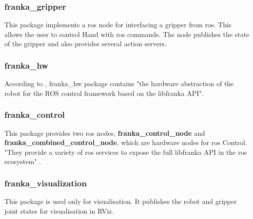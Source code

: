 \subsubsection*{franka\_gripper}
\label{subsubsec:ros_setup_robotic_system_integration_ros_franka_ros_franka_gripper}

This package implements a \gls{ros} node for interfacing a gripper from \gls{ros}. This allows the user to control Hand with \gls{ros} commands. The node publishes the state of the gripper and also provides several action servers.


\subsubsection*{franka\_hw}
\label{subsubsec:ros_setup_robotic_system_integration_ros_franka_ros_franka_hw}

According to \cite{FrankaEmikaGmbH_fci_documentation}, franka\_hw package contains "the hardware abstraction of the robot for the ROS control framework based on the libfranka API".


\subsubsection*{franka\_control}
\label{subsubsec:ros_setup_robotic_system_integration_ros_franka_ros_franka_control}

This package provides two \gls{ros} nodes, \textbf{franka\_control\_node} and \textbf{franka\_combined\_control\_node}, which are hardware nodes for \gls{ros} Control. "They provide a variety of \gls{ros} services to expose the full libfranka API in the \gls{ros} ecosystem" \cite{FrankaEmikaGmbH_fci_documentation}. 


\subsubsection*{franka\_visualization}
\label{subsubsec:ros_setup_robotic_system_integration_ros_franka_ros_franka_visualization}

This package is used only for visualisation. It publishes the robot and gripper joint states for visualisation in RViz.

